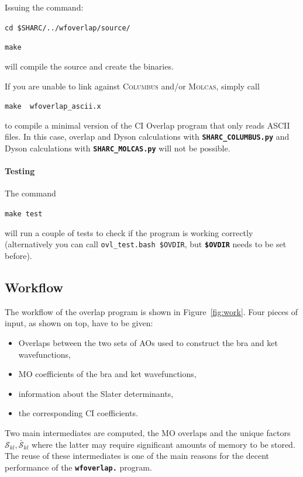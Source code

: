 \documentclass[a4paper,10pt,DIV=15,openany]{scrbook}
\newcommand{\ttt}[1]{\textbf{\texttt{#1}}}
\newenvironment{example}{
  \setlength{\OuterFrameSep}{3pt}
  \vspace{0mm}
  \definecolor{shadecolor}{HTML}{E4F4FF}
  \begin{shaded}
}{
  \end{shaded}
}
\begin{document}
Issuing the command:

\begin{example}
\verb|cd $SHARC/../wfoverlap/source/|

\verb|make|
\end{example}

will compile the source and create the binaries.


If you are unable to link against \textsc{Columbus} and/or \textsc{Molcas}, simply call

\begin{example}
\verb|make  wfoverlap_ascii.x|
\end{example}

to compile a minimal version of the CI Overlap program that only reads ASCII files.
In this case, overlap and Dyson calculations with \ttt{SHARC\_COLUMBUS.py} and Dyson calculations with \ttt{SHARC\_MOLCAS.py} will not be possible.

\paragraph{Testing}

The command 

\begin{example}
\verb|make test|
\end{example}

will run a couple of tests to check if the program is working correctly (alternatively you can call \verb|ovl_test.bash $OVDIR|, but \ttt{\$OVDIR} needs to be set before).


\subsection{Workflow}

The workflow of the overlap program is shown in Figure~\ref{fig:work}.
Four pieces of input, as shown on top, have to be given:
\begin{itemize}
\item Overlaps between the two sets of AOs used to construct the bra and ket wavefunctions,
\item MO coefficients of the bra and ket wavefunctions,
\item information about the Slater determinants,
\item the corresponding CI coefficients.
\end{itemize}

Two main intermediates are computed, the MO overlaps and the unique factors $\mathcal{S}_{kl}, \bar{\mathcal{S}}_{kl}$ where the latter may require significant amounts of memory to be stored.
The reuse of these intermediates is one of the main reasons for the decent performance of the \ttt{wfoverlap.} program.
\end{document}
